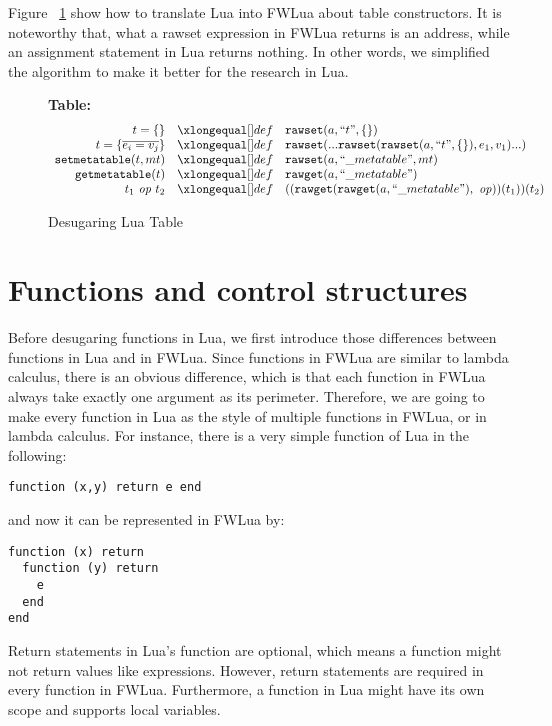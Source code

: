 Figure ~\ref{fig:desLuaTable} show how to translate Lua into FWLua about table constructors. It is noteworthy that, what a rawset expression in FWLua returns is an address, while an assignment statement in Lua returns nothing. In other words, we simplified the algorithm to make it better for the research in Lua.

\begin{figure}
\caption{Desugaring Lua Table}\label{fig:desLuaTable}
{\bf Table:}\[
\begin{array}{rclcl}
\desugar{t = \{\}}{{\tt rawset}(a,``t", \{\})}
\desugar{t = \{\overline{e_i = v_j}\}}{{\tt rawset}(...{\tt rawset}({\tt rawset}(a,``t", \{\}), e_1, v_1)...)}
\desugar{{\tt setmetatable}(t, mt)}{{\tt rawset}(a,``\_metatable", mt)}
\desugar{{\tt getmetatable}(t)}{{\tt rawget}(a,``\_metatable")}
\desugar{t_1~{\it op}~t_2}{(({\tt rawget}({\tt rawget}(a,``\_metatable"),~{\it op}))(t_1))(t_2)}
\end{array}\]
\end{figure}

\section{Functions and control structures}\label{sec:TraFunc}
Before desugaring functions in Lua, we first introduce those differences between functions in Lua and in FWLua. Since functions in FWLua are similar to lambda calculus, there is an obvious difference, which is that each function in FWLua always take exactly one argument as its perimeter. Therefore, we are going to make every function in Lua as the style of multiple functions in FWLua, or in lambda calculus. For instance, there is a very simple function of Lua in the following:

\begin{verbatim}
function (x,y) return e end
\end{verbatim}

and now it can be represented in FWLua by:

\begin{verbatim}
function (x) return 
  function (y) return 
    e
  end
end
\end{verbatim}


Return statements in Lua's function are optional, which means a function might not return values like expressions. However, return statements are required in every function in FWLua.
Furthermore, a function in Lua might have its own scope and supports local variables. 

